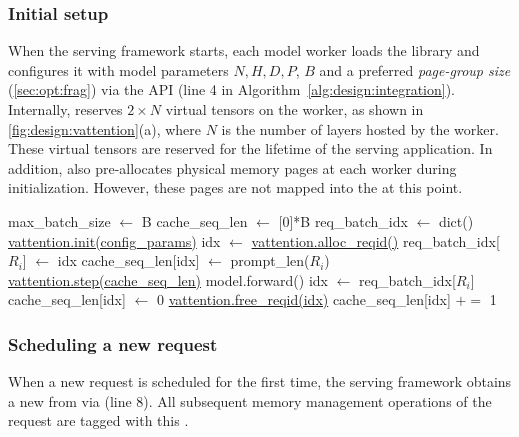 \subsubsection{Initial setup} When the serving framework starts, each model worker loads the \sysname library and configures it with model parameters $N, H, D, P$, $B$ and a preferred {\it page-group size} (\autoref{sec:opt:frag}) via the \vattninit API (line 4 in Algorithm~\autoref{alg:design:integration}). Internally,  \sysname reserves $2\times N$ virtual tensors on the worker, as shown in \autoref{fig:design:vattention}(a),  where $N$ is the number of layers hosted by the worker. These virtual tensors are reserved for the lifetime of the serving application. In addition, \sysname also pre-allocates physical memory pages at each worker during initialization. However, these pages are not mapped into the \kvcache at this point.


\begin{algorithm}[t]
\caption{Using \sysname in a serving framework.}
\label{alg:design:integration}
\begin{algorithmic}[1]
\State \textnormal{max\_batch\_size $\gets$ B}
\State \textnormal{cache\_seq\_len $\gets$ [0]*B}
\State \textnormal{req\_batch\_idx $\gets$ dict()}
\State \textnormal{\underline{vattention.init(config\_params)}}
            \State \textnormal{idx $\gets$ \underline{vattention.alloc\_reqid()}}
            \State \textnormal{req\_batch\_idx[$R_i$] $\gets$ idx}
            \State \textnormal{cache\_seq\_len[idx] $\gets$ prompt\_len($R_i$)}
        \EndIf
    \EndFor
    \State \textnormal{\underline{vattention.step(cache\_seq\_len)}}
    \State \textnormal{model.forward()}
        \State \textnormal{idx $\gets$ req\_batch\_idx[$R_i$]}
            \State \textnormal{cache\_seq\_len[idx] $\gets$ 0}
            \State \textnormal{\underline{vattention.free\_reqid(idx)}}
        \Else
            \State \textnormal{cache\_seq\_len[idx] $+=$ 1}
        \EndIf
    \EndFor
\EndWhile
\end{algorithmic}
\end{algorithm}

\subsubsection{Scheduling a new request} When a new request is scheduled for the first time, the serving framework obtains a new \reqid from \sysname via \vattnallocid (line 8). All subsequent memory management operations of the request are tagged with this \reqid.



